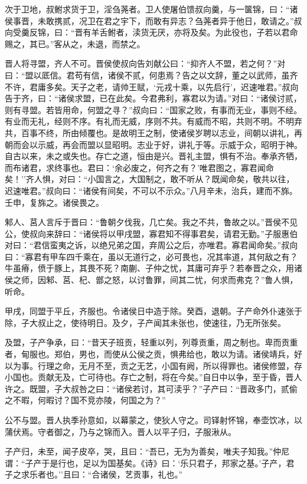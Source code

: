 \documentclass[]{article}
\begin{document}
次于卫地，叔鲋求货于卫，淫刍荛者。卫人使屠伯馈叔向羹，与一箧锦，曰：``诸侯事晋，未敢携贰，况卫在君之宇下，而敢有异志？刍荛者异于他日，敢请之。''叔向受羹反锦，曰：``晋有羊舌鲋者，渎货无厌，亦将及矣。为此役也，子若以君命赐之，其已。''客从之，未退，而禁之。

晋人将寻盟，齐人不可。晋侯使叔向告刘献公曰：``抑齐人不盟，若之何？''对曰：``盟以厎信。君苟有信，诸侯不贰，何患焉？告之以文辞，董之以武师，虽齐不许，君庸多矣。天子之老，请帅王赋，`元戎十乘，以先启行'，迟速唯君。''叔向告于齐，曰：``诸侯求盟，已在此矣。今君弗利，寡君以为请。''对曰：``诸侯讨贰，则有寻盟。若皆用命，何盟之寻？''叔向曰：``国家之败，有事而无业，事则不经。有业而无礼，经则不序。有礼而无威，序则不共。有威而不昭，共则不明。不明弃共，百事不终，所由倾覆也。是故明王之制，使诸侯岁聘以志业，间朝以讲礼，再朝而会以示威，再会而盟以显昭明。志业于好，讲礼于等。示威于众，昭明于神。自古以来，未之或失也。存亡之道，恒由是兴。晋礼主盟，惧有不治。奉承齐牺，而布诸君，求终事也。君曰：`余必废之，何齐之有？'唯君图之，寡君闻命矣！''齐人惧，对曰：``小国言之，大国制之，敢不听从？既闻命矣，敬共以往，迟速唯君。''叔向曰：``诸侯有间矣，不可以不示众。''八月辛未，治兵，建而不旆。壬申，复旆之。诸侯畏之。

邾人、莒人言斥于晋曰：``鲁朝夕伐我，几亡矣。我之不共，鲁故之以。''晋侯不见公，使叔向来辞曰：``诸侯将以甲戌盟，寡君知不得事君矣，请君无勤。''子服惠伯对曰：``君信蛮夷之诉，以绝兄弟之国，弃周公之后，亦唯君。寡君闻命矣。''叔向曰：``寡君有甲车四千乘在，虽以无道行之，必可畏也，况其率道，其何敌之有？牛虽瘠，偾于豚上，其畏不死？南蒯、子仲之忧，其庸可弃乎？若奉晋之众，用诸侯之师，因邾、莒、杞、鄫之怒，以讨鲁罪，间其二忧，何求而弗克？''鲁人惧，听命。

甲戌，同盟于平丘，齐服也。令诸侯日中造于除。癸酉，退朝。子产命外仆速张于除，子大叔止之，使待明日。及夕，子产闻其未张也，使速往，乃无所张矣。

及盟，子产争承，曰：``昔天子班贡，轻重以列，列尊贡重，周之制也。卑而贡重者，甸服也。郑伯，男也，而使从公侯之贡，惧弗给也，敢以为请。诸侯靖兵，好以为事。行理之命，无月不至，贡之无艺，小国有阙，所以得罪也。诸侯修盟，存小国也。贡献无及，亡可待也。存亡之制，将在今矣。''自日中以争，至于昏，晋人许之。既盟，子大叔咎之曰：``诸侯若讨，其可渎乎？''子产曰：``晋政多门，贰偷之不暇，何暇讨？国不竞亦陵，何国之为？''

公不与盟。晋人执季孙意如，以幕蒙之，使狄人守之。司铎射怀锦，奉壶饮冰，以蒲伏焉。守者御之，乃与之锦而入。晋人以平子归，子服湫从。

子产归，未至，闻子皮卒，哭，且曰：``吾已，无为为善矣，唯夫子知我。''仲尼谓：``子产于是行也，足以为国基矣。《诗》曰：`乐只君子，邦家之基。'子产，君子之求乐者也。''且曰：``合诸侯，艺贡事，礼也。''
\end{document}
